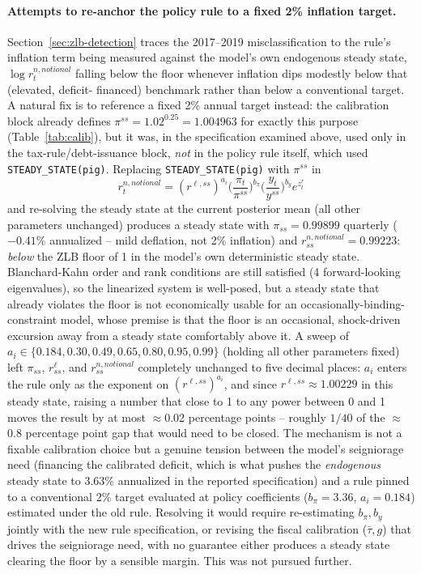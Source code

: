\documentclass[11pt]{article}
\begin{document}
\paragraph{Attempts to re-anchor the policy rule to a fixed 2\% inflation
target.} Section~\ref{sec:zlb-detection} traces the 2017--2019
misclassification to the rule's inflation term being measured against the
model's own endogenous steady state, $\log r^{n,notional}_t$ falling below
the floor whenever inflation dips modestly below that (elevated, deficit-
financed) benchmark rather than below a conventional target. A natural fix
is to reference a fixed 2\% annual target instead: the calibration block
already defines $\pi^{ss}=1.02^{0.25}=1.004963$ for exactly this purpose
(Table~\ref{tab:calib}), but it was, in the specification examined above,
used only in the tax-rule/debt-issuance block, \emph{not} in the policy
rule itself, which used \texttt{STEADY\_STATE(pig)}. Replacing
\texttt{STEADY\_STATE(pig)} with $\pi^{ss}$ in
\[
r^{n,notional}_t = (r^{\ell,ss})^{a_i}\Big(\frac{\pi_t}{\pi^{ss}}\Big)^{b_\pi}
\Big(\frac{y_t}{y^{ss}}\Big)^{b_y} e^{z^r_t}
\]
and re-solving the steady state at the current posterior mean (all other
parameters unchanged) produces a steady state with $\pi_{ss}=0.99899$
quarterly ($-0.41\%$ annualized -- mild deflation, not 2\% inflation) and
$r^{n,notional}_{ss}=0.99223$: \emph{below} the ZLB floor of 1 in the
model's own deterministic steady state. Blanchard-Kahn order and rank
conditions are still satisfied (4 forward-looking eigenvalues), so the
linearized system is well-posed, but a steady state that already violates
the floor is not economically usable for an occasionally-binding-constraint
model, whose premise is that the floor is an occasional, shock-driven
excursion away from a steady state comfortably above it. A sweep of
$a_i\in\{0.184,0.30,0.49,0.65,0.80,0.95,0.99\}$ (holding all other
parameters fixed) left $\pi_{ss}$, $r^{\ell}_{ss}$, and
$r^{n,notional}_{ss}$ completely unchanged to five decimal places: $a_i$
enters the rule only as the exponent on $(r^{\ell,ss})^{a_i}$, and since
$r^{\ell,ss}\approx1.00229$ in this steady state, raising a number that
close to 1 to any power between 0 and 1 moves the result by at most
$\approx$0.02 percentage points -- roughly $1/40$ of the $\approx$0.8
percentage point gap that would need to be closed. The mechanism is not
a fixable calibration choice but a genuine tension between the model's
seigniorage need (financing the calibrated deficit, which is what pushes
the \emph{endogenous} steady state to 3.63\% annualized in the reported
specification) and a rule pinned to a conventional 2\% target evaluated at
policy coefficients ($b_\pi=3.36$, $a_i=0.184$) estimated under the old
rule. Resolving it would require re-estimating $b_\pi,b_y$ jointly with
the new rule specification, or revising the fiscal calibration
($\bar\tau,g$) that drives the seigniorage need, with no guarantee either
produces a steady state clearing the floor by a sensible margin. This was
not pursued further.
\end{document}
